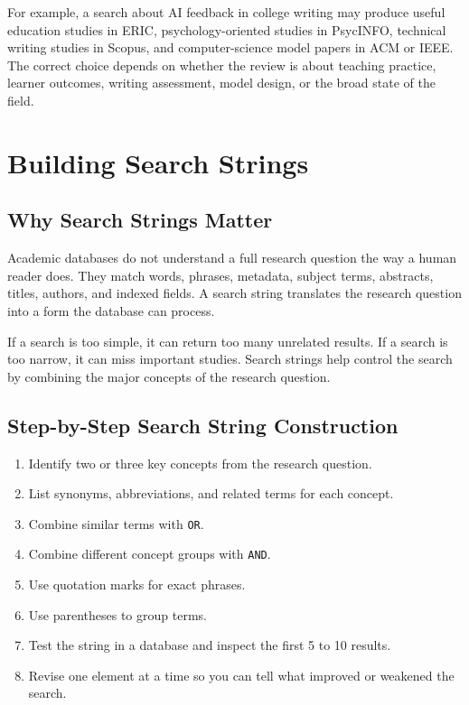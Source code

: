 \documentclass[11pt,letterpaper]{article}
\begin{document}
For example, a search about AI feedback in college writing may produce useful education studies in ERIC, psychology-oriented studies in PsycINFO, technical writing studies in Scopus, and computer-science model papers in ACM or IEEE. The correct choice depends on whether the review is about teaching practice, learner outcomes, writing assessment, model design, or the broad state of the field.

\section{Building Search Strings}

\subsection{Why Search Strings Matter}

Academic databases do not understand a full research question the way a human reader does. They match words, phrases, metadata, subject terms, abstracts, titles, authors, and indexed fields. A search string translates the research question into a form the database can process.

If a search is too simple, it can return too many unrelated results. If a search is too narrow, it can miss important studies. Search strings help control the search by combining the major concepts of the research question.

\subsection{Step-by-Step Search String Construction}

\begin{enumerate}
  \item Identify two or three key concepts from the research question.
  \item List synonyms, abbreviations, and related terms for each concept.
  \item Combine similar terms with \texttt{OR}.
  \item Combine different concept groups with \texttt{AND}.
  \item Use quotation marks for exact phrases.
  \item Use parentheses to group terms.
  \item Test the string in a database and inspect the first 5 to 10 results.
  \item Revise one element at a time so you can tell what improved or weakened the search.
\end{enumerate}
\end{document}

